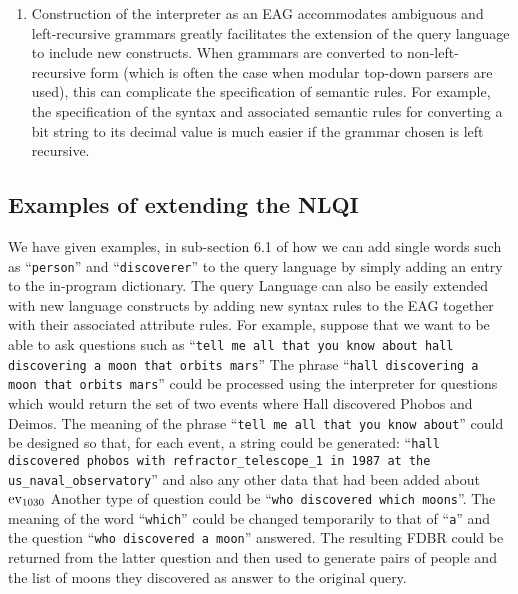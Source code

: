 \documentclass[../main.tex]{subfiles}
\begin{document}
\begin{refsection}
\begin{enumerate}
	\item Construction of the interpreter as an EAG accommodates ambiguous and left-recursive
	grammars greatly facilitates the extension of the query language to include new
	constructs. When grammars are converted to non-left-recursive
	form (which is often the case when modular top-down parsers are used), this can complicate the
	specification of semantic rules. For example, the specification of the syntax and associated
	semantic rules for converting a bit string to its decimal value is much easier if the grammar
	chosen is left recursive.
\end{enumerate}

\subsection{Examples of extending the NLQI}

We have given examples, in sub-section 6.1 of how we can add single words such as ``\texttt{person}'' and
``\texttt{discoverer}'' to the query language by simply adding an entry to the in-program dictionary.
The query Language can also be easily extended with new language constructs by adding new syntax
rules to the EAG together with their associated attribute rules. For example, suppose that we want to be able to ask questions such as ``\texttt{tell me all that you
know about hall discovering a moon that orbits mars}'' The phrase ``\texttt{hall discovering a moon that orbits
mars}'' could be processed using the interpreter for questions which would return the set of two events
where Hall discovered Phobos and Deimos. The meaning of the phrase ``\texttt{tell me all that
you know about}'' could be designed so that, for each event, a string could be generated: ``\texttt{hall discovered phobos with refractor\_telescope\_1 in 1987 at the us\_naval\_observatory}''
and also any other data that had been added about $\operatorname{ev}_{1030}$
Another type of question could be ``\texttt{who discovered which moons}''. The meaning of the word ``\texttt{which}''
could be changed temporarily to that of ``\texttt{a}'' and the question ``\texttt{who discovered a moon}'' answered. The
resulting FDBR could be returned from the latter question and then used to generate pairs of people and
the list of moons they discovered as answer to the original query.


\end{refsection}
\end{document}
